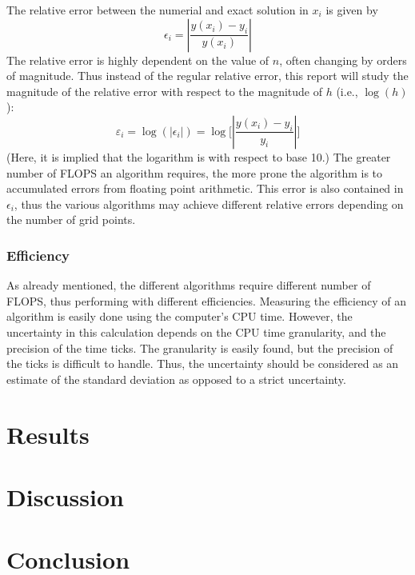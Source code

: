\documentclass[reprint,english]{revtex4-1}
\begin{document}
The relative error between the numerial and exact solution in \(x_i\) is given by
\begin{equation}\label{eq:relative_error}
\epsilon_i=\left|\frac{y(x_i)-y_i}{y(x_i)}\right|
\end{equation}
The relative error is highly dependent on the value of \(n\), often changing by orders of magnitude. Thus instead of the regular relative error, this report will study the magnitude of the relative error with respect to the magnitude of \(h\) (i.e., \(\log(h)\)):
\begin{equation}\label{eq:relative_error_magnitude}
\varepsilon_i=\log(|\epsilon_i|)=\log\bigg[\left|\frac{y(x_i)-y_i}{y_i}\right|\bigg]
\end{equation}
(Here, it is implied that the logarithm is with respect to base 10.)
The greater number of FLOPS an algorithm requires, the more prone the algorithm is to accumulated errors from floating point arithmetic. This error is also contained in \(\epsilon_i\), thus the various algorithms may achieve different relative errors depending on the number of grid points.
\subsubsection{Efficiency}
As already mentioned, the different algorithms require different number of FLOPS, thus performing with different efficiencies. Measuring the efficiency of an algorithm is easily done using the computer's CPU time. However, the uncertainty in this calculation depends on the CPU time granularity, and the precision of the time ticks. The granularity is easily found, but the precision of the ticks is difficult to handle. Thus, the uncertainty should be considered as an estimate of the standard deviation as opposed to a strict uncertainty.
\clearpage
\section{Results}



















\clearpage
\section{Discussion}
\section{Conclusion}
%
%
	 
\end{document}
